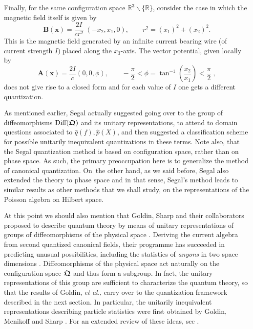 \documentclass[12pt]{amsart}
\numberwithin{equation}{section}
\theoremstyle{remark}
\newcommand{\bfrakQ}{\mbox{\boldmath $\mathfrak Q$}}
\newcommand{\bA}{\mathbf A}
\newcommand{\bB}{\mathbf B}
\newcommand{\bx}{\mathbf x}
\begin{document}
Finally, for the same configuration space
${\mathbb R}^3\backslash\{\mathbb R\}$,
consider the case in which the magnetic field itself is given by
$$ \bB (\bx )  = \frac {2I}{c r^2}\; ( -x_2 , x_1 , 0 ) , \qquad   r^2 =
               (x_1)^2 +  (x_2)^2 . $$
This is the magnetic field generated by an infinite current bearing wire
(of current strength  $I$)
placed along the $x_3$-axis.  The vector potential, given locally by
$$
  \bA (\bx ) = \frac {2I}c (0, 0, \phi ) , \qquad
  -\frac {\pi}2 <  \phi = \tan^{-1} \left(\frac {x_2}{x_1}\right)
       < \frac {\pi}2 \; , $$
does not give rise to a closed form  and for each value of $I$ one gets a
different quantization.


\bigskip

As mentioned earlier, Segal actually suggested going over to the group of
diffeomorphisms $\mbox{\rm Diff} (\bfrakQ )$ and its unitary representations,
to attend to domain questions associated to $\widehat{q}(f), \widehat{p}(X)$,
and then suggested a classification scheme for possible unitarily inequivalent
quantizations in these terms. Note also, that the Segal quantization method is
based on configuration space, rather than on phase space. As such, the primary
preoccupation here is to generalize the method of canonical quantization.
On~the other hand, as we said before, Segal also extended the theory to phase
space and in that sense, Segal's method leads to similar results as other
methods that we shall study, on the representations of the Poisson algebra
on Hilbert space.

  At this point we should also mention that Goldin, Sharp and their collaborators
proposed to describe quantum theory by means of unitary representations of groups of
diffeomorphisms of the physical space \cite{bib:gol1,bib:GGPS,bib:GolSh1}.
Deriving the current algebra from second quantized canonical fields, their programme
has succeeded in predicting unusual possibilities, including the statistics
of {\em anyons} in two space dimensions \cite{bib:GoMeSh,bib:-golmensh1,bib:GoSh2,bib:LeiMyr}.
Diffeomorphisms of the physical space act naturally on the configuration space
$\bfrakQ$ and thus form a subgroup. In fact, the unitary representations of this group
are sufficient to characterize the quantum theory, so that the results of Goldin,
{\em et al.\/}, carry over to the quantization framework described in the next section.
In particular, the unitarily inequivalent representations describing particle
statistics were first obtained by Goldin, Menikoff and Sharp
\cite{bib:GoMeSh2,bib:GoMeSh,bib:-golmensh1}. For an extended review of these ideas,
see \cite{bib:gol2}.
\end{document}

